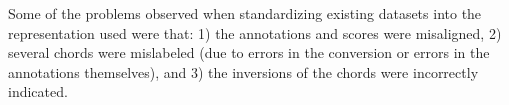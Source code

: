 
Some of the problems observed when standardizing existing
datasets into the representation used were that: 1) the
annotations and scores were misaligned, 2) several chords
were mislabeled (due to errors in the conversion or errors
in the annotations themselves), and 3) the inversions of the
chords were incorrectly indicated.
